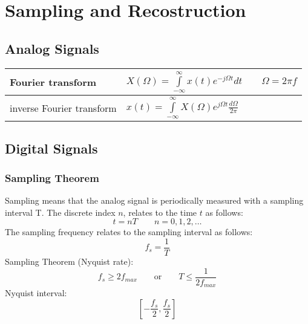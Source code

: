 \section{Sampling and Recostruction}
\subsection{Analog Signals}
\begin{tabularx}{\linewidth}{|l|X|}
	\hline
	Fourier transform & $X(\Omega) = \int\limits_{-\infty}^{\infty} x(t)e^{-j\Omega t}dt \qquad \Omega = 2\pi f $ \\
	\hline
	inverse Fourier transform & $ x(t) = \int\limits_{-\infty}^{\infty} X(\Omega)e^{j\Omega t} \frac{d\Omega}{2 \pi} $ \\
	\hline
\end{tabularx}

\subsection{Digital Signals}
\subsubsection{Sampling Theorem}
Sampling means that the analog signal is periodically measured with a sampling interval T. The discrete index $n$, relates to
the time $t$ as follows:
\[ t = nT \qquad n = 0,1,2,\ldots \]
The sampling frequency relates to the sampling interval as follows:
\[ f_s = \frac{1}{T} \]
Sampling Theorem (Nyquist rate):
\[ f_s \geq 2f_{max} \qquad \text{or} \qquad T \leq \frac{1}{2f_{max}} \]
Nyquist interval:
\[ \left[-\frac{f_s}{2}, \frac{f_s}{2}\right] \]
